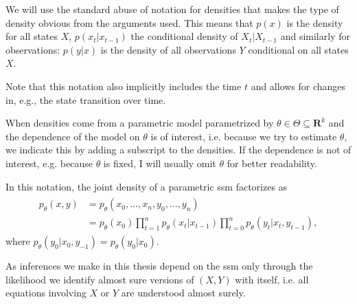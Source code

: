 \begin{notation}
    \label{not:densities}
    We will use the standard abuse of notation for densities that makes the type of density \glqq{}obvious\grqq{} from the arguments used.
    This means that $p(x)$ is the density for all states $X$, $p(x_t|x_{t - 1})$ the conditional density of $X_t|X_{t - 1}$ and similarly for observations: $p(y|x)$ is the density of all observations $Y$ conditional on all states $X$.

    Note that this notation also implicitly includes the time $t$ and allows for changes in, e.g., the state transition over time.

    When densities come from a parametric model parametrized by $\theta \in \Theta \subseteq \mathbf{R}^{k}$ and the dependence of the model on $\theta$ is of interest, i.e. because we try to estimate $\theta$, we indicate this by adding a subscript to the densities.
    If the dependence is not of interest, e.g. because $\theta$ is fixed, I will usually omit $\theta$ for better readability.

    In this notation, the joint density of a parametric \gls{ssm} factorizes as
    \begin{align}
        \label{eq:joint_density}
        \begin{split}
        p_\theta(x,y) & = p_\theta(x_0, \dots, x_{n}, y_0, \dots, y_{n})                                                              \\
                      & = p_\theta (x_0)\prod_{t = 1}^{n} p_\theta(x_{t}|x_{t - 1}) \prod_{t = 0}^{n} p_\theta(y_t | x_t, y_{t - 1}),
        \end{split}
    \end{align}
    where $p_\theta(y_0|x_0, y_{-1}) = p_\theta(y_0| x_0)$.

    As inferences we make in this thesis depend on the \gls{ssm} only through the likelihood we identify almost sure versions of $(X, Y)$ with itself, i.e. all equations involving $X$ or $Y$ are understood almost surely.
\end{notation}

